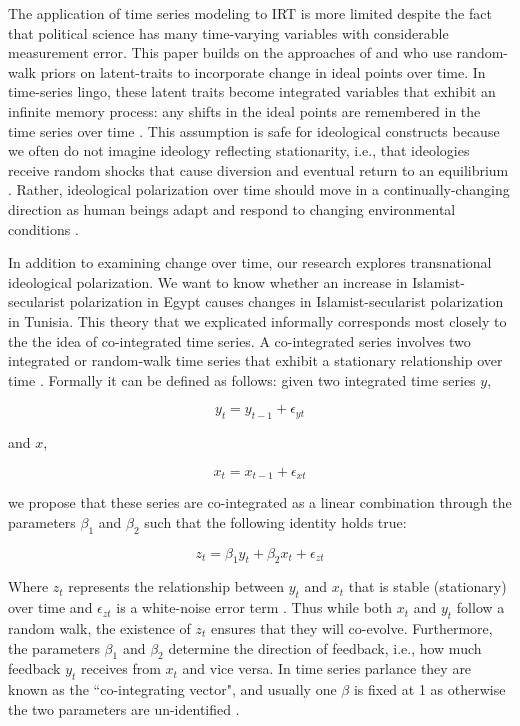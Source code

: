 \documentclass[12pt]{article}
\begin{document}
The application of time series modeling to IRT is more limited despite the fact that political science has many time-varying variables with considerable measurement error. This paper builds on the approaches of \textcite{quinn2002} and \textcite{kropko2013} who use random-walk priors on latent-traits to incorporate change in ideal points over time. In time-series lingo, these latent traits become integrated variables that exhibit an infinite memory process: any shifts in the ideal points are remembered in the time series over time \parencite[Ch. 5]{timeseries2014}. This assumption is safe for ideological constructs because we often do not imagine ideology reflecting stationarity, i.e., that ideologies receive random shocks that cause diversion and eventual return to an equilibrium \parencite[Ch. 2]{timeseries2014}. Rather, ideological polarization over time should move in a continually-changing direction as human beings adapt and respond to changing environmental conditions \parencite{owen2010clash}.

In addition to examining change over time, our research explores transnational ideological polarization. We want to know whether an increase in Islamist-secularist polarization in Egypt causes changes in Islamist-secularist polarization in Tunisia. This theory that we explicated informally corresponds most closely to the the idea of co-integrated time series. A co-integrated series involves two integrated or random-walk time series that exhibit a stationary relationship over time \parencite{engle1987}. Formally it can be defined as follows: given two integrated time series  $y$,

\begin{equation}
	y_t = y_{t-1} + \epsilon_{yt}
\end{equation}

and $x$,

\begin{equation}
x_t = x_{t-1} + \epsilon_{xt}
\end{equation}

we propose that these series are co-integrated as a linear combination through the parameters $\beta_1$ and $\beta_2$ such that the following identity holds true:

\begin{equation}
z_t = \beta_1 y_t + \beta_2 x_t + \epsilon_{zt}
\end{equation}

Where $z_t$ represents the relationship between $y_t$ and $x_t$ that is stable (stationary) over time and $\epsilon_{zt}$ is a white-noise error term \parencite[253]{engle1987}. Thus while both $x_t$ and $y_t$ follow a random walk, the existence of $z_t$ ensures that they will co-evolve. Furthermore, the parameters $\beta_1$ and $\beta_2$ determine the direction of feedback, i.e., how much feedback $y_t$ receives from $x_t$ and vice versa. In time series parlance they are known as the ``co-integrating vector", and usually one $\beta$ is fixed at 1 as otherwise the two parameters are un-identified \parencite[253]{timeseries2014}. 
\end{document}
